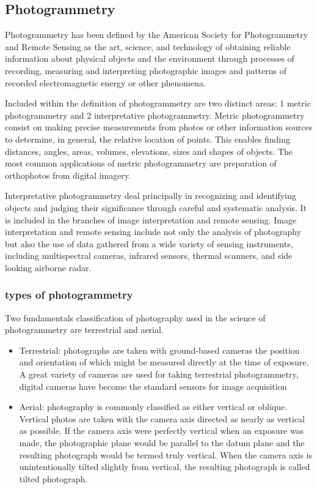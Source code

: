 \subsection{Photogrammetry}
Photogrammetry has been defined by the American Society for Photogrammetry and Remote Sensing as the art, science, and technology of obtaining reliable information about physical objects and the environment through processes of recording, measuring and interpreting photographic images and patterns of recorded electromagnetic energy or other phenomena. \cite{ASPRS}

Included within the definition of photogrammetry are two distinct areas: 1 metric photogrammetry and 2 interpretative photogrammetry. Metric photogrammetry consist on making precise measurements from photos or other information sources to determine, in general, the relative location of points. This enables finding distances, angles, areas, volumes, elevations, sizes and shapes of objects. The most common applications of metric photogrammetry are preparation of orthophotos from digital imagery.

Interpretative photogrammetry deal principally in recognizing and identifying objects and judging their significance through careful and systematic analysis. It is included in the branches of image interpretation and remote sensing. Image interpretation and remote sensing include not only the analysis of photography but also the use of data gathered from a wide variety of sensing instruments, including multispectral cameras, infrared sensors, thermal scanners, and side looking airborne radar.\cite{elements_photogrammetry}
\subsubsection{types of photogrammetry}
Two fundamentals classification of photography used in the science of photogrammetry are terrestrial and aerial. 
\begin{itemize}
\item Terrestrial: photographs are taken with ground-based cameras the position and orientation of which might be measured directly at the time of exposure. A great variety of cameras are used for taking terrestrial photogrammetry, digital cameras have become the standard sensors for image acquisition 
\item Aerial: photography is commonly classified as either vertical or oblique. Vertical photos are taken with the camera axis directed as nearly as vertical as possible. If the camera axis were perfectly vertical when an exposure was made, the photographic plane would be parallel to the datum plane and the resulting photograph would be termed truly vertical. When the camera axis is unintentionally tilted slightly from vertical, the resulting photograph is called tilted photograph.\cite{elements_photogrammetry}
\end{itemize}
